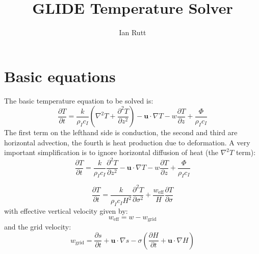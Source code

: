 \documentclass[10pt,english,a4paper]{article}
\begin{document}
\title{GLIDE Temperature Solver}
\author{Ian Rutt}
\maketitle

\section{Basic equations}
The basic temperature equation to be solved is:
%
\begin{equation}
  \frac{\partial T}{\partial t} = \frac{k}{\rho_I c_I}\left(\nabla^2 T
  +\frac{\partial^2 T}{\partial z^2}\right)
  -\mathbf{u}\cdot\nabla T
  -w\frac{\partial T}{\partial z}
  +\frac{\Phi}{\rho_I c_I}
\end{equation}
%
The first term on the lefthand side is conduction, the second and
third are horizontal advection, the fourth is heat production due to
deformation. A very important simplification is to ignore horizontal
diffusion of heat (the $\nabla^2 T$ term):
%
\begin{equation}
  \frac{\partial T}{\partial t} = \frac{k}{\rho_I c_I}\frac{\partial^2 T}{\partial z^2}
  -\mathbf{u}\cdot\nabla T
  -w\frac{\partial T}{\partial z}
  +\frac{\Phi}{\rho_I c_I}
\end{equation}

%
\begin{equation}
\frac{\partial T}{\partial t} = \frac{k}{\rho_I c_I H^2}\frac{\partial^2 T}{\partial \sigma^2}+\frac{w_{\mathrm{eff}}}{H}\frac{\partial T}{\partial \sigma}
\end{equation}
%
with effective vertical velocity given by:
%
\begin{equation}
w_{\mathrm{eff}}=w-w_{\mathrm{grid}}
\end{equation}
%
and the grid velocity:
%
\begin{equation}
w_{\mathrm{grid}} = \frac{\partial s}{\partial t}+\mathbf{u}\cdot\nabla s - \sigma \left(\frac{\partial H}{\partial t}+\mathbf{u}\cdot\nabla H \right) 
\end{equation}
%
\end{document}
